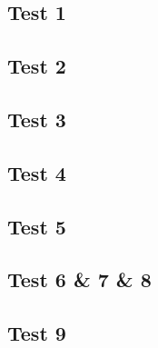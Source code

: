 \documentclass[12pt, a4paper]{article}
\begin{document}
\subsection{Test 1}
\subsection{Test 2}
\subsection{Test 3}
\subsection{Test 4}
\subsection{Test 5}
\subsection{Test 6 \& 7 \& 8}
\subsection{Test 9}
\end{document}
